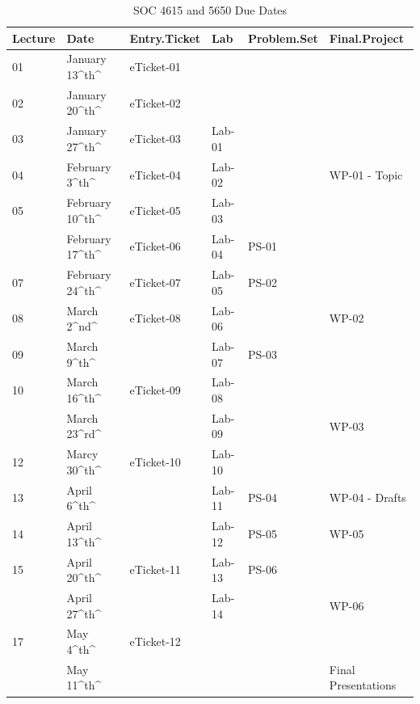 \documentclass[]{book}
\begin{document}
\begin{table}

\caption{\label{tab:unnamed-chunk-2}SOC 4615 and 5650 Due Dates}
\centering
\begin{tabular}[t]{llllll}
\toprule
Lecture & Date & Entry.Ticket & Lab & Problem.Set & Final.Project\\
\midrule
01 & January 13\textasciicircum{}th\textasciicircum{} & eTicket-01 &  &  & \\
02 & January 20\textasciicircum{}th\textasciicircum{} & eTicket-02 &  &  & \\
03 & January 27\textasciicircum{}th\textasciicircum{} & eTicket-03 & Lab-01 &  & \\
04 & February 3\textasciicircum{}th\textasciicircum{} & eTicket-04 & Lab-02 &  & WP-01 - Topic\\
05 & February 10\textasciicircum{}th\textasciicircum{} & eTicket-05 & Lab-03 &  & \\
\addlinespace
06 & February 17\textasciicircum{}th\textasciicircum{} & eTicket-06 & Lab-04 & PS-01 & \\
07 & February 24\textasciicircum{}th\textasciicircum{} & eTicket-07 & Lab-05 & PS-02 & \\
08 & March 2\textasciicircum{}nd\textasciicircum{} & eTicket-08 & Lab-06 &  & WP-02\\
09 & March 9\textasciicircum{}th\textasciicircum{} &  & Lab-07 & PS-03 & \\
10 & March 16\textasciicircum{}th\textasciicircum{} & eTicket-09 & Lab-08 &  & \\
\addlinespace
11 & March 23\textasciicircum{}rd\textasciicircum{} &  & Lab-09 &  & WP-03\\
12 & Marcy 30\textasciicircum{}th\textasciicircum{} & eTicket-10 & Lab-10 &  & \\
13 & April 6\textasciicircum{}th\textasciicircum{} &  & Lab-11 & PS-04 & WP-04 - Drafts\\
14 & April 13\textasciicircum{}th\textasciicircum{} &  & Lab-12 & PS-05 & WP-05\\
15 & April 20\textasciicircum{}th\textasciicircum{} & eTicket-11 & Lab-13 & PS-06 & \\
\addlinespace
16 & April 27\textasciicircum{}th\textasciicircum{} &  & Lab-14 &  & WP-06\\
17 & May 4\textasciicircum{}th\textasciicircum{} & eTicket-12 &  &  & \\
 & May 11\textasciicircum{}th\textasciicircum{} &  &  &  & Final Presentations\\
\bottomrule
\end{tabular}
\end{table}
\end{document}
